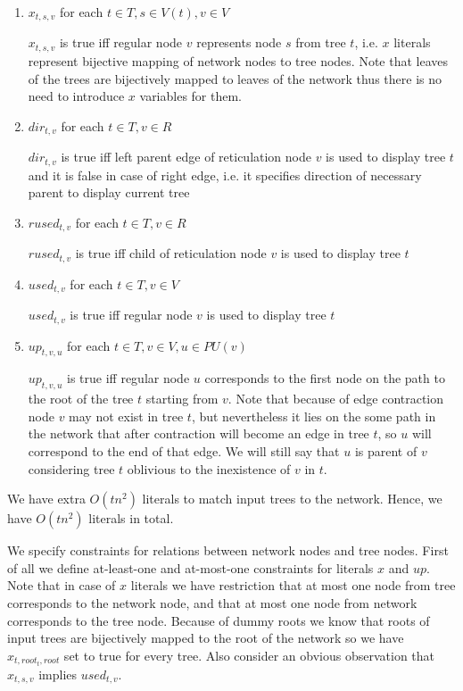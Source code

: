 \documentclass[runningheads, envcountsame, a4paper]{llncs}
\begin{document}
\begin{enumerate}

\item $x_{t,s,v}$ for each $t \in T, s \in V(t), v \in V$

$x_{t,s,v}$ is true iff regular node $v$ represents node $s$ from tree $t$, i.e. $x$ literals represent bijective 
mapping of network nodes to tree nodes.
Note that leaves of the trees are bijectively mapped to leaves of the network thus there is no need to introduce $x$ variables for them.

\item $dir_{t,v}$ for each $t \in T, v \in R$

$dir_{t,v}$ is true iff left parent edge of reticulation node $v$ is used to display tree $t$ and it is false in case 
of right edge, i.e. it specifies direction of necessary parent to display current tree

\item $rused_{t,v}$ for each $t \in T, v \in R$

$rused_{t,v}$ is true iff child of reticulation node $v$ is used to display tree $t$

\item $used_{t,v}$ for each $t \in T, v \in V$

$used_{t,v}$ is true iff regular node $v$ is used to display tree $t$

\item $up_{t,v,u}$ for each $t \in T, v \in V, u \in PU(v)$

$up_{t,v,u}$ is true iff regular node $u$ corresponds to the first node on the path to the root of the tree $t$ starting 
from $v$. Note that because of edge contraction node $v$ may not exist in tree $t$, but nevertheless it lies on 
the some path in the network that after contraction will become an edge in tree $t$, so $u$ will correspond to 
the end of that edge. We will still say that $u$ is parent of $v$ considering tree $t$ oblivious to the inexistence of
$v$ in $t$.

\end{enumerate}

We have extra $O(t n^2)$ literals to match input trees to the network. Hence, we have $O(tn^2)$ literals in total.

We specify constraints for relations between network nodes and tree nodes. 
First of all we define at-least-one and at-most-one constraints for literals $x$ and $up$. Note that in case 
of $x$ literals we have restriction that at most one node from tree corresponds to the network node, and that at 
most one node from network corresponds to the tree node. Because of dummy roots we know that roots of input trees 
are bijectively mapped to the root of the network so we have $x_{t,root_t,root}$ set to true for every tree. Also 
consider an obvious observation that $x_{t,s,v}$ implies $used_{t,v}$.
\end{document}
